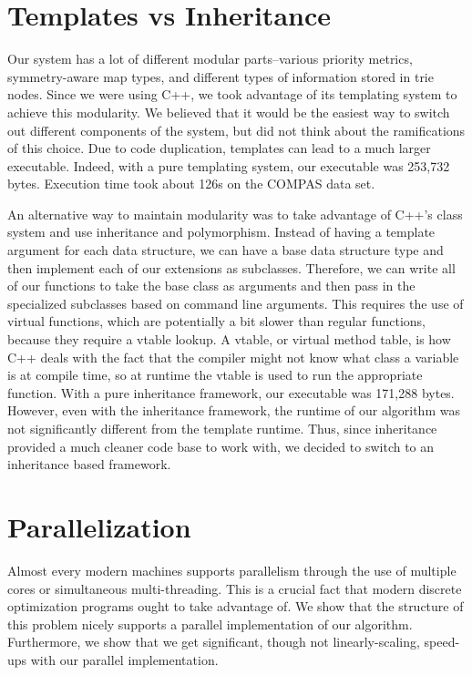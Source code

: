 \section{Templates vs Inheritance}
Our system has a lot of different modular parts--various priority metrics, symmetry-aware map types, and different types of information stored in trie nodes.
Since we were using C++, we took advantage of its templating system to achieve this modularity.
We believed that it would be the easiest way to switch out different components of the system, but did not think about the ramifications of this choice.
Due to code duplication, templates can lead to a much larger executable.
Indeed, with a pure templating system, our executable was 253,732 bytes.
Execution time took about 126s on the COMPAS data set.

An alternative way to maintain modularity was to take advantage of C++'s class system and use inheritance and polymorphism.
Instead of having a template argument for each data structure, we can have a base data structure type and then implement each of our extensions as subclasses.
Therefore, we can write all of our functions to take the base class as arguments and then pass in the specialized subclasses based on command line arguments.
This requires the use of virtual functions, which are potentially a bit slower than regular functions, because they require a vtable lookup.
A vtable, or virtual method table, is how C++ deals with the fact that the compiler might not know what class a variable is at compile time, so at runtime the vtable is used to run the appropriate function.
With a pure inheritance framework, our executable was 171,288 bytes.
However, even with the inheritance framework, the runtime of our algorithm was not significantly different from the template runtime.
Thus, since inheritance provided a much cleaner code base to work with, we decided to switch to an inheritance based framework.

\section{Parallelization}
Almost every modern machines supports parallelism through the use of multiple cores or simultaneous multi-threading.
This is a crucial fact that modern discrete optimization programs ought to take advantage of.
We show that the structure of this problem nicely supports a parallel implementation of our algorithm.
Furthermore, we show that we get significant, though not linearly-scaling, speed-ups with our parallel implementation.

